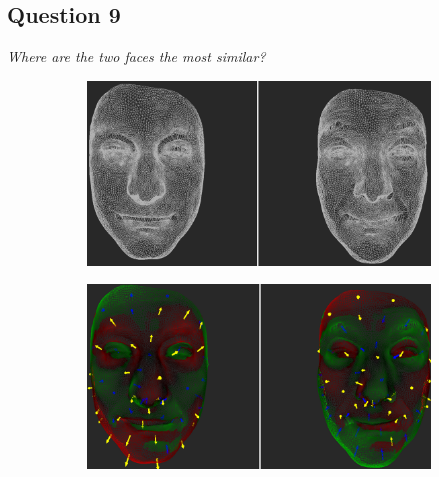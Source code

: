 \subsection{Question 9}
\label{attch:complete_study_results-question9}

\begin{center}{\it Where are the two faces the most similar?}\end{center}

\begin{figure}[h]
\centering
\begin{subfigure}{0.49\textwidth}
\includegraphics[width=\textwidth]{./img-study/pair19.PNG}
\caption{}
\label{fig:study-8-19}
\end{subfigure}
\begin{subfigure}{0.49\textwidth}
\includegraphics[width=\textwidth]{./img-study/pair21.PNG}
\caption{}
\label{fig:study-8-21}
\end{subfigure}


\end{figure}
